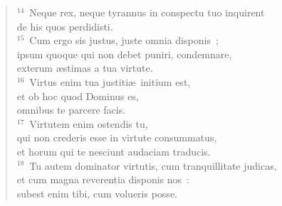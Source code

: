 \begin{verse}
${}^{14}$~Neque rex, neque tyrannus in conspectu tuo inquirent\\ de his quos perdidisti.\\
${}^{15}$~Cum ergo sis justus, juste omnia disponis~;\\ ipsum quoque qui non debet puniri, condemnare,\\ exterum \ae stimas a tua virtute.\\
${}^{16}$~Virtus enim tua justiti\ae\ initium est,\\ et ob hoc quod Dominus es,\\ omnibus te parcere facis.\\
${}^{17}$~Virtutem enim ostendis tu,\\ qui non crederis esse in virtute consummatus,\\ et horum qui te nesciunt audaciam traducis.\\
${}^{18}$~Tu autem dominator virtutis, cum tranquillitate judicas,\\ et cum magna reverentia disponis nos~:\\ subest enim tibi, cum volueris posse.\end{verse}


